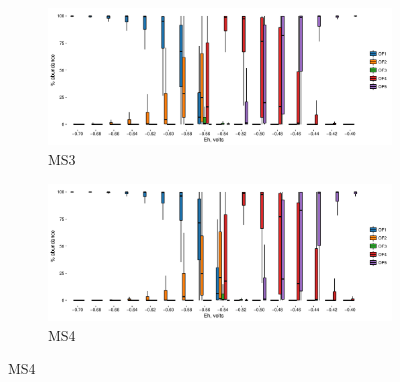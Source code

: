 \begin{figure}[h]\ContinuedFloat
\centering

    \begin{subfigure}[b]{\linewidth}
       	\includegraphics[width=1\linewidth]{"figs_app2/boxplot_ggplot_02bin Mound OF3 iter 999"}
       	\caption{MS3}
        \label{fig:MS3_mc}
    \end{subfigure}
    \begin{subfigure}[b]{\linewidth}
    	\includegraphics[width=1\linewidth]{"figs_app2/boxplot_ggplot_02bin Mound OF4 iter 999"}
    	\caption{MS4}
        \label{fig:MS4_mc}
    \end{subfigure}
    
\end{figure}

\newpage

